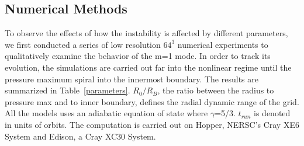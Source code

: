 \documentclass[iop,revtex4]{emulateapj}
\begin{document}
\subsection{Numerical Methods}
To observe the effects of how the instability is affected by different parameters, we first conducted a series of low resolution $64^3$ numerical experiments to qualitatively examine the behavior of the m=1 mode. In order to track its evolution, the simulations are carried out far into the nonlinear regime until the pressure maximum spiral into the innermost boundary. The results are summarized in Table~\ref{parameters}. $R_0/R_B$, the ratio between the radius to pressure max and to inner boundary, defines the radial dynamic range of the grid.  All the models uses an adiabatic equation of state where $\gamma$=5/3. %
$t_{run}$ is denoted in units of orbits. The computation is carried out on Hopper, NERSC's Cray XE6 System and Edison, a Cray XC30 System.
\end{document}
